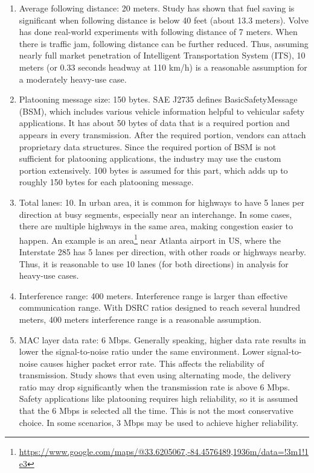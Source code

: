 \documentclass[12pt]{report}
\begin{document}
\begin{enumerate}
  \item Average following distance: 20 meters. Study \cite{watts2015computational} has shown that fuel saving is significant when following distance is below 40 feet (about 13.3 meters). Volve \cite{volvo2015} has done real-world experiments with following distance of 7 meters. When there is traffic jam, following distance can be further reduced. Thus, assuming nearly full market penetration of Intelligent Transportation System (ITS), 10 meters (or 0.33 seconds headway at 110 km/h) is a reasonable assumption for a moderately heavy-use case.
  \item Platooning message size: 150 bytes. SAE J2735 defines BasicSafetyMessage (BSM), which includes various vehicle information helpful to vehicular safety applications. It has about 50 bytes of data that is a required portion and appears in every transmission. After the required portion, vendors can attach proprietary data structures. Since the required portion of BSM is not sufficient for platooning applications, the industry may use the custom portion extensively. 100 bytes is assumed for this part, which adds up to roughly 150 bytes for each platooning message.
  \item Total lanes: 10. In urban area, it is common for highways to have 5 lanes per direction at busy segments, especially near an interchange. In some cases, there are multiple highways in the same area, making congestion easier to happen. An example is an area\footnote{\url{https://www.google.com/maps/@33.6205067,-84.4576489,1936m/data=!3m1!1e3}} near Atlanta airport in US, where the Interstate 285 has 5 lanes per direction, with other roads or highways nearby. Thus, it is reasonable to use 10 lanes (for both directions) in analysis for heavy-use cases.
  \item Interference range: 400 meters. Interference range is larger than effective communication range. With DSRC ratios designed to reach several hundred meters, 400 meters interference range is a reasonable assumption.
  \item MAC layer data rate: 6 Mbps. Generally speaking, higher data rate results in lower the signal-to-noise ratio under the same environment. Lower signal-to-noise causes higher packet error rate. This affects the reliability of transmission. Study \cite{songDSRC2016} shows that even using alternating mode, the delivery ratio may drop significantly when the transmission rate is above 6 Mbps. Safety applications like platooning requires high reliability, so it is assumed that the 6 Mbps is selected all the time. This is not the most conservative choice. In some scenarios, 3 Mbps may be used to achieve higher reliability.

\end{enumerate}
\end{document}
